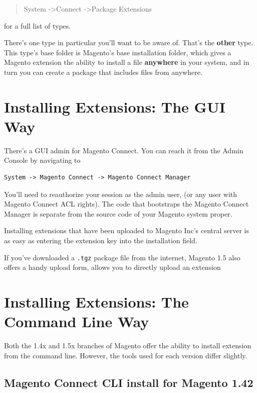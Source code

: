 \documentclass[oneside]{book}
\begin{document}
\begin{quote}
System -\textgreater  Connect -\textgreater  Package Extensions
\end{quote}

for a full list of types. 

There's one type in particular you'll want to be aware of.  That's the \textbf{other} type.  This type's base folder is Magento's base installation folder, which gives a Magento extension the ability to install a file \textbf{anywhere} in your system, and in turn you can create a package that includes files from anywhere.

\section{Installing Extensions: The GUI Way}

There's a GUI admin for Magento Connect.  You can reach it from the Admin Console by navigating to 

\begin{lstlisting}
System -> Magento Connect -> Magento Connect Manager

\end{lstlisting}


You'll need to reauthorize your session as the admin user, (or any user with Magento Connect ACL rights).  The code that bootstraps the Magento Connect Manager is separate from the source code of your Magento system proper. 

Installing extensions that have been uploaded to Magento Inc's central server is as easy as entering the extension key into the installation field.

If you've downloaded a \footnotesize\texttt{.tgz} \normalsize  package file from the internet, Magento 1.5 also offers a handy upload form, allows you to directly upload an extension

\section{Installing Extensions: The Command Line Way}

Both the 1.4x and 1.5x branches of Magento offer the ability to install extension from the command line.  However, the tools used for each version differ slightly.

\subsection{Magento Connect CLI install for Magento 1.42}
\end{document}

